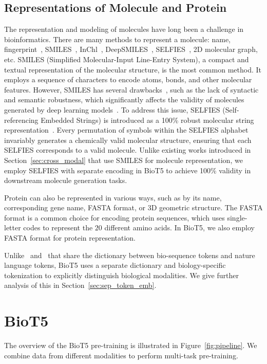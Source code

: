 \documentclass[11pt]{article}
\newcommand{\method}{{BioT5}}
\begin{document}
\subsection{Representations of Molecule and Protein}
\label{sec:mol_pro_rep}
The representation and modeling of molecules have long been a challenge in bioinformatics.
There are many methods to represent a molecule: name, fingerprint~\citep{rogers2010extended}, SMILES~\citep{weininger1988smiles,weininger1989smiles}, InChl~\citep{heller2013inchi}, DeepSMILES~\citep{o2018deepsmiles}, SELFIES~\citep{krenn2020self}, 2D molecular graph, etc.
SMILES (Simplified Molecular-Input Line-Entry System), a compact and textual representation of the molecular structure, is the most common method. It employs a sequence of characters to encode atoms, bonds, and other molecular features.
However, SMILES has several drawbacks~\citep{krenn2022selfies}, such as the lack of syntactic and semantic robustness, which significantly affects the validity of molecules generated by deep learning models~\citep{DBLP:conf/emnlp/EdwardsLRHCJ22}.
To address this issue, SELFIES (Self-referencing Embedded Strings) is introduced as a 100\% robust molecular string representation~\citep{krenn2020self}.
Every permutation of symbols within the SELFIES alphabet invariably generates a chemically valid molecular structure, ensuring that each SELFIES corresponds to a valid molecule. 
Unlike existing works introduced in Section~\ref{sec:cross_modal} that use SMILES for molecule representation, we employ SELFIES with separate encoding in \method{} to achieve 100\% validity in downstream molecule generation tasks.

Protein can also be represented in various ways, such as by its name, corresponding gene name, FASTA format, or 3D geometric structure.
The FASTA format is a common choice for encoding protein sequences, which uses single-letter codes to represent the $20$ different amino acids. 
In \method, we also employ FASTA format for protein representation.

Unlike~\citet{DBLP:conf/emnlp/EdwardsLRHCJ22} and~\citet{taylor2022galactica} that share the dictionary between bio-sequence tokens and nature language tokens, \method{} uses a separate dictionary and biology-specific tokenization to explicitly distinguish biological modalities. 
We give further analysis of this in Section~\ref{sec:sep_token_emb}.

\section{BioT5}
The overview of the \method{} pre-training is illustrated in Figure~\ref{fig:pipeline}.
We combine data from different modalities to perform multi-task pre-training.
\end{document}
